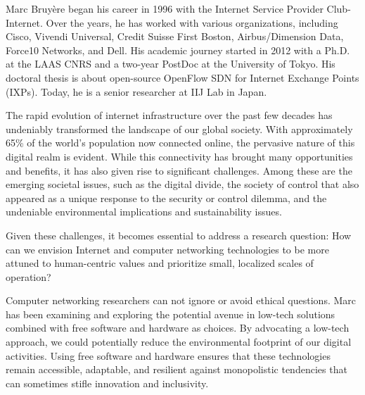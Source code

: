 \documentclass[journal]{IEEEtran}
\begin{document}
 

\begin{IEEEbiographynophoto}{Marc Bruyère}
  began  his  career  in  1996  with  the  Internet  Service  Provider
  Club-Internet.   Over   the  years,  he  has   worked  with  various
  organizations,  including Cisco,  Vivendi  Universal, Credit  Suisse
  First  Boston, Airbus/Dimension  Data, Force10  Networks, and  Dell.
  His academic journey  started in 2012 with a Ph.D.  at the LAAS CNRS
  and  a two-year  PostDoc at  the University  of Tokyo.  His doctoral
  thesis  is  about open-source  OpenFlow  SDN  for Internet  Exchange
  Points (IXPs). Today, he is a senior researcher at IIJ Lab in Japan.

  The rapid  evolution of  internet infrastructure  over the  past few
  decades  has  undeniably transformed  the  landscape  of our  global
  society.   With approximately  65\%  of the  world’s population  now
  connected  online, the  pervasive nature  of this  digital realm  is
  evident.  While this connectivity has brought many opportunities and
  benefits, it has  also given rise to  significant challenges.  Among
  these are the emerging societal  issues, such as the digital divide,
  the society  of control that also  appeared as a unique  response to
  the security  or control  dilemma, and the  undeniable environmental
  implications and sustainability issues.

  Given these challenges,  it becomes essential to  address a research
  question:  How  can we  envision  Internet  and computer  networking
  technologies  to  be  more   attuned  to  human-centric  values  and
  prioritize small, localized scales of operation?

  Computer  networking researchers  can  not ignore  or avoid  ethical
  questions.   Marc has  been  examining and  exploring the  potential
  avenue  in  low-tech  solutions  combined  with  free  software  and
  hardware as  choices.  By advocating  a low-tech approach,  we could
  potentially  reduce  the  environmental  footprint  of  our  digital
  activities.   Using free  software and  hardware ensures  that these
  technologies  remain accessible,  adaptable,  and resilient  against
  monopolistic  tendencies that  can sometimes  stifle innovation  and
  inclusivity.
\end{IEEEbiographynophoto}
\end{document}
